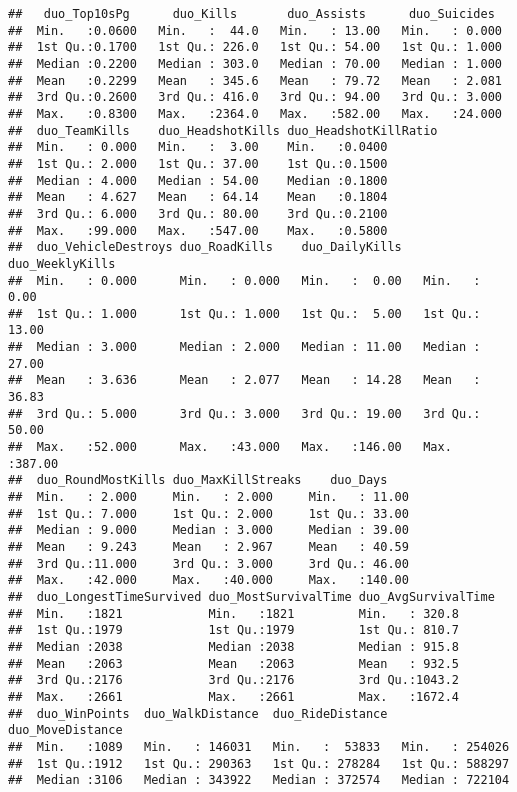 \documentclass[]{article}
\begin{document}
\begin{verbatim}
##   duo_Top10sPg      duo_Kills       duo_Assists      duo_Suicides   
##  Min.   :0.0600   Min.   :  44.0   Min.   : 13.00   Min.   : 0.000  
##  1st Qu.:0.1700   1st Qu.: 226.0   1st Qu.: 54.00   1st Qu.: 1.000  
##  Median :0.2200   Median : 303.0   Median : 70.00   Median : 1.000  
##  Mean   :0.2299   Mean   : 345.6   Mean   : 79.72   Mean   : 2.081  
##  3rd Qu.:0.2600   3rd Qu.: 416.0   3rd Qu.: 94.00   3rd Qu.: 3.000  
##  Max.   :0.8300   Max.   :2364.0   Max.   :582.00   Max.   :24.000  
##  duo_TeamKills    duo_HeadshotKills duo_HeadshotKillRatio
##  Min.   : 0.000   Min.   :  3.00    Min.   :0.0400       
##  1st Qu.: 2.000   1st Qu.: 37.00    1st Qu.:0.1500       
##  Median : 4.000   Median : 54.00    Median :0.1800       
##  Mean   : 4.627   Mean   : 64.14    Mean   :0.1804       
##  3rd Qu.: 6.000   3rd Qu.: 80.00    3rd Qu.:0.2100       
##  Max.   :99.000   Max.   :547.00    Max.   :0.5800       
##  duo_VehicleDestroys duo_RoadKills    duo_DailyKills   duo_WeeklyKills 
##  Min.   : 0.000      Min.   : 0.000   Min.   :  0.00   Min.   :  0.00  
##  1st Qu.: 1.000      1st Qu.: 1.000   1st Qu.:  5.00   1st Qu.: 13.00  
##  Median : 3.000      Median : 2.000   Median : 11.00   Median : 27.00  
##  Mean   : 3.636      Mean   : 2.077   Mean   : 14.28   Mean   : 36.83  
##  3rd Qu.: 5.000      3rd Qu.: 3.000   3rd Qu.: 19.00   3rd Qu.: 50.00  
##  Max.   :52.000      Max.   :43.000   Max.   :146.00   Max.   :387.00  
##  duo_RoundMostKills duo_MaxKillStreaks    duo_Days     
##  Min.   : 2.000     Min.   : 2.000     Min.   : 11.00  
##  1st Qu.: 7.000     1st Qu.: 2.000     1st Qu.: 33.00  
##  Median : 9.000     Median : 3.000     Median : 39.00  
##  Mean   : 9.243     Mean   : 2.967     Mean   : 40.59  
##  3rd Qu.:11.000     3rd Qu.: 3.000     3rd Qu.: 46.00  
##  Max.   :42.000     Max.   :40.000     Max.   :140.00  
##  duo_LongestTimeSurvived duo_MostSurvivalTime duo_AvgSurvivalTime
##  Min.   :1821            Min.   :1821         Min.   : 320.8     
##  1st Qu.:1979            1st Qu.:1979         1st Qu.: 810.7     
##  Median :2038            Median :2038         Median : 915.8     
##  Mean   :2063            Mean   :2063         Mean   : 932.5     
##  3rd Qu.:2176            3rd Qu.:2176         3rd Qu.:1043.2     
##  Max.   :2661            Max.   :2661         Max.   :1672.4     
##  duo_WinPoints  duo_WalkDistance  duo_RideDistance  duo_MoveDistance 
##  Min.   :1089   Min.   : 146031   Min.   :  53833   Min.   : 254026  
##  1st Qu.:1912   1st Qu.: 290363   1st Qu.: 278284   1st Qu.: 588297  
##  Median :3106   Median : 343922   Median : 372574   Median : 722104  

\end{verbatim}
\end{document}
